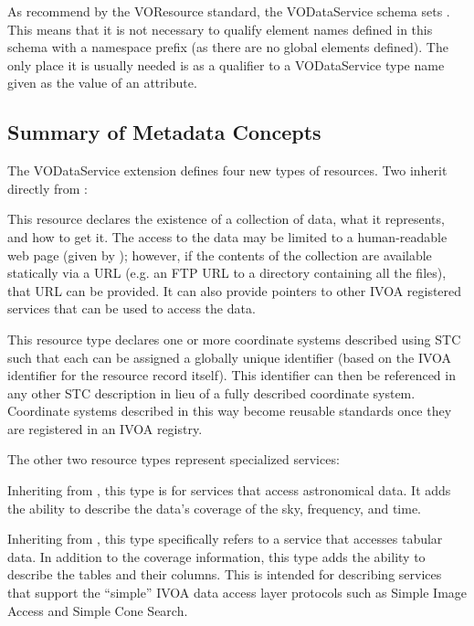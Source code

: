 \documentclass[11pt,a4paper]{ivoa}
\begin{document}
As recommend by the VOResource standard, the
VODataService schema sets .
This means that it is not necessary to qualify element names defined
in this schema with a namespace prefix (as there are no global
elements defined).  The only place it is usually needed is as a
qualifier to a VODataService type name given as the value of an
 attribute.  


\subsection{Summary of Metadata Concepts}
\label{sect:summ}


The VODataService extension defines four new types of resources.  Two inherit
directly from :


\begin{bigdescription}
\item[\xmlel{vs:DataCollection}]
This resource declares the existence of a collection of data, what
       it represents, and how to get it.  The access to the data may be
       limited to a human-readable web page (given by
       ); however, if the
       contents of the collection are available statically via a
       URL (e.g. an FTP URL to a directory containing all the files),
       that URL can be provided.  It can also provide pointers to
       other IVOA registered services that can be used to access the data.

\item[\xmlel{vs:StandardSTC}]
This resource type declares one or more coordinate systems described
       using STC \citep{2007ivoa.spec.1030R} such that each can be
       assigned a globally unique identifier (based on the IVOA
       identifier for the resource record itself).  This identifier
       can then be referenced in any other STC description in lieu of
       a fully described coordinate system.  Coordinate systems
       described in this way become reusable standards once they are
       registered in an IVOA registry.
\end{bigdescription}

The other two resource types represent specialized services:


\begin{bigdescription}
\item[\xmlel{vs:DataService}]
Inheriting from , this type is for
       services that access astronomical data.  It adds the ability to
       describe the data's coverage of the
       sky, frequency, and time.

\item[\xmlel{vs:CatalogService}]
Inheriting from , this type
       specifically refers to a service that accesses tabular data.
       In addition to the coverage information, this type adds the
       ability to describe the tables and their columns.  This is
       intended for describing services that support the ``simple'' IVOA
       data access layer protocols such as Simple Image Access
        and Simple Cone Search.
\end{bigdescription}
\end{document}
